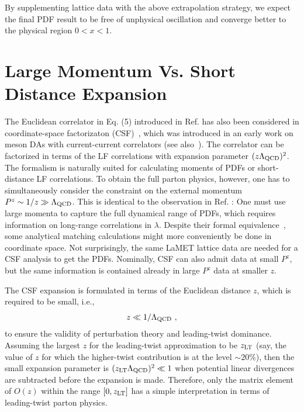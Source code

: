 \documentclass[preprint,12pt]{elsarticle}
\begin{document}
By supplementing lattice data with the above extrapolation strategy, we expect the final PDF result to be free of unphysical oscillation and converge better to the physical region $0<x<1$.

\section{Large Momentum Vs. Short Distance Expansion}

The Euclidean correlator in Eq. (5) introduced in Ref. \cite{Ji:2013dva}
has also been considered in coordinate-space factorizaton (CSF)~\cite{Radyushkin:2017cyf}, which was
introduced in an early work on meson DAs with current-current correlators
\cite{Braun:2007wv} (see also~\cite{Ma:2017pxb}).
The correlator can be factorized in terms of the LF correlations
with expansion parameter $(z\Lambda_{\rm QCD})^2$. The formalism is
naturally suited for calculating moments of PDFs or short-distance
LF correlations. To obtain the full parton physics, however, one has to
simultaneously consider the constraint on the external momentum $P^z\sim 1/z \gg \Lambda_{\rm QCD}$.
This is identical to the observation in Ref. \cite{Ji:2014gla}: One must use
large momenta to capture the full dynamical range of PDFs, which requires information on
long-range correlations in $\lambda$.
Despite their formal equivalence~\cite{Ji:2017rah,Izubuchi:2018srq,Radyushkin:2017lvu},
some analytical matching calculations might
more conveniently be done in coordinate space. Not surprisingly, the same LaMET
lattice data are needed for a CSF analysis to get the PDFs.
Nominally, CSF can also admit data at small $P^z$, but the same information is
contained already in large $P^z$ data at smaller $z$.

The CSF expansion is formulated in terms of
the Euclidean distance $z$, which is required to be small, i.e.,
\begin{equation}
         z\ll 1/\Lambda_{\rm QCD}\ ,
\end{equation}
to ensure the validity of perturbation theory and leading-twist dominance.
Assuming the largest $z$ for the leading-twist
approximation to be $z_{\rm LT}$ (say, the value of $z$ for which the higher-twist contribution
is at the level $\sim20\%$), then the small
expansion parameter is $(z_{\rm LT}\Lambda_{\rm QCD})^2\ll 1 $ when
potential linear divergences are subtracted
before the expansion is made. Therefore, only the matrix element
of $O(z)$ within the range $[0, z_{\rm LT}]$ has a simple interpretation
in terms of leading-twist parton physics.
\end{document}
